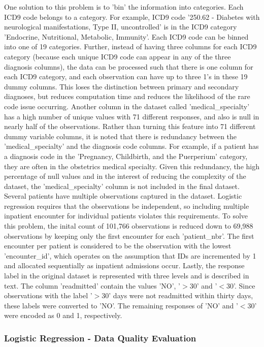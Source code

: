 \documentclass[sigconf]{acmart}
\begin{document}
One solution to this problem is to 'bin' the information into categories. Each ICD9 code belongs to a category. For example, ICD9 code '250.62 - Diabetes with neurological manifestations, Type II, uncontrolled' is in the ICD9 category 'Endocrine, Nutritional, Metabolic, Immunity'. Each ICD9 code can be binned into one of 19 categories. Further, instead of having three columns for each ICD9 category (because each unique ICD9 code can appear in any of the three diagnosis columns), the data can be processed such that there is one column for each ICD9 category, and each observation can have up to three 1's in these 19 dummy columns. This loses the distinction between primary and secondary diagnoses, but reduces computation time and reduces the likelihood of the rare code issue occurring.
Another column in the dataset called 'medical\_specialty' has a high number of unique values with 71 different responses, and also is null in nearly half of the observations. Rather than turning this feature into 71 different dummy variable columns, it is noted that there is redundancy between the 'medical\_specialty' and the diagnosis code columns. For example, if a patient has a diagnosis code in the 'Pregnancy, Childbirth, and the Puerperium' category, they are often in the obstetrics medical specialty. Given this redundancy, the high percentage of null values and in the interest of reducing the complexity of the dataset, the 'medical\_specialty' column is not included in the final dataset.
Several patients have multiple observations captured in the dataset. Logistic regression requires that the observations be independent, so including multiple inpatient encounter for individual patients violates this requirements. To solve this problem, the inital count of 101,766 observations is reduced down to 69,988 observations by keeping only the first encounter for each 'patient\_nbr'. The first encounter per patient is considered to be the observation with the lowest 'encounter\_id', which operates on the assumption that IDs are incremented by 1 and allocated sequentially as inpatient admissions occur.
Lastly, the response label in the original dataset is represented with three levels and is described in text. The column 'readmitted' contain the values 'NO', '$>$30' and '$<$30'. Since observations with the label '$>$30' days were not readmitted within thirty days, these labels were converted to 'NO'. The remaining responses of 'NO' and '$<$30' were encoded as 0 and 1, respectively.

\subsubsection{Logistic Regression - Data Quality Evaluation}
\end{document}
